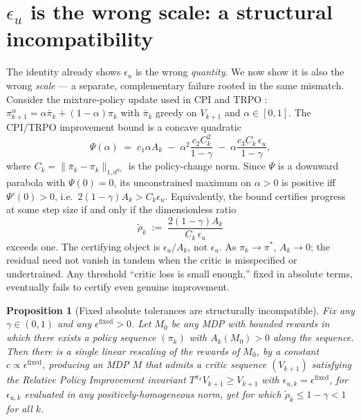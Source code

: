 \documentclass{article}
\newtheorem{proposition}{Proposition}
\begin{document}
\section{$\epsilon_u$ is the wrong scale: a structural incompatibility}
\label{sec:theory}

The identity already shows $\epsilon_u$ is the wrong \emph{quantity}. We now show it is also the wrong \emph{scale} --- a separate, complementary failure rooted in the same mismatch. Consider the mixture-policy update used in CPI \citep{kakade2002approximately} and TRPO \citep{schulman2015trust}: $\pi_{k+1}^\alpha = \alpha \bar\pi_k + (1-\alpha) \pi_k$ with $\bar\pi_k$ greedy on $V_{k+1}$ and $\alpha \in [0,1]$. The CPI/TRPO improvement bound is a concave quadratic
\[
\Psi(\alpha) \;=\; c_1 \alpha A_k \;-\; \alpha^2 \frac{c_2 C_k^2}{1-\gamma} \;-\; \alpha \frac{c_3 C_k \,\epsilon_u}{1-\gamma},
\]
where $C_k = \|\bar\pi_k - \pi_k\|_{1,d^{\pi_k}}$ is the policy-change norm. Since $\Psi$ is a downward parabola with $\Psi(0)=0$, its unconstrained maximum on $\alpha > 0$ is positive iff $\Psi'(0) > 0$, i.e.\ $2(1-\gamma)A_k > C_k \epsilon_u$. Equivalently, the bound certifies progress at some step size if and only if the dimensionless ratio
\begin{equation*}
\tilde\rho_k \;:=\; \frac{2(1-\gamma) A_k}{C_k \,\epsilon_u}
\end{equation*}
exceeds one. The certifying object is $\epsilon_u / A_k$, not $\epsilon_u$. As $\pi_k \to \pi^*$, $A_k \to 0$; the residual need not vanish in tandem when the critic is misspecified or undertrained. Any threshold ``critic loss is small enough,'' fixed in absolute terms, eventually fails to certify even genuine improvement.

\begin{proposition}[Fixed absolute tolerances are structurally incompatible]
\label{prop:no-go}
Fix any $\gamma \in (0,1)$ and any $\epsilon^{\text{fixed}} > 0$. Let $M_0$ be any MDP with bounded rewards in which there exists a policy sequence $(\pi_k)$ with $A_k(M_0) > 0$ along the sequence. Then there is a single linear rescaling of the rewards of $M_0$, by a constant $c \propto \epsilon^{\text{fixed}}$, producing an MDP $M$ that admits a critic sequence $(V_{k+1})$ satisfying the Relative Policy Improvement invariant $T^{\pi_k} V_{k+1} \ge V_{k+1}$ \citep{pirotta2013relative} with $\epsilon_{u,k} = \epsilon^{\text{fixed}}$, for $\epsilon_{u,k}$ evaluated in any positively-homogeneous norm, yet for which $\tilde\rho_k \le 1 - \gamma < 1$ for all $k$.
\end{proposition}
\end{document}
